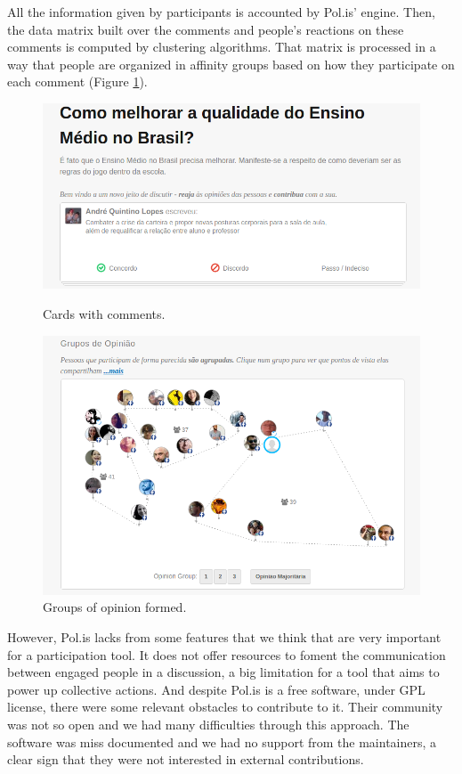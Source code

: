 \documentclass{llncs}
\begin{document}
  All the information given by participants is accounted by Pol.is' engine.
Then, the data matrix built over the comments and people's reactions on these
comments is computed by clustering algorithms. That matrix is processed in
a way that people are organized in affinity groups based on how they participate
on each comment (Figure \ref{fig:polis-2}). 

 \begin{figure}[hbt]
   \centering
   \begin{minipage}{.50\textwidth}
     \includegraphics[width=.9\linewidth]{images/polis1.png}
     \caption{Cards with comments.}
     \label{fig:polis-1}
   \end{minipage}
   \begin{minipage}{.49\textwidth}
     \includegraphics[width=.9\linewidth]{images/polis2.png}
     \caption{Groups of opinion formed.}
     \label{fig:polis-2}
   \end{minipage}
 \end{figure}

  However, Pol.is lacks from some features that we think that are very important
for a participation tool. It does not offer resources to foment the communication
between engaged people in a discussion, a big limitation for a tool that
aims to power up collective actions. And despite Pol.is is a free software, under GPL
license, there were some relevant obstacles to contribute to it. Their community
was not so open and we had many difficulties through this approach.
The software was miss documented and we had no support from the maintainers, a
clear sign that they were not interested in external contributions.
\end{document}
